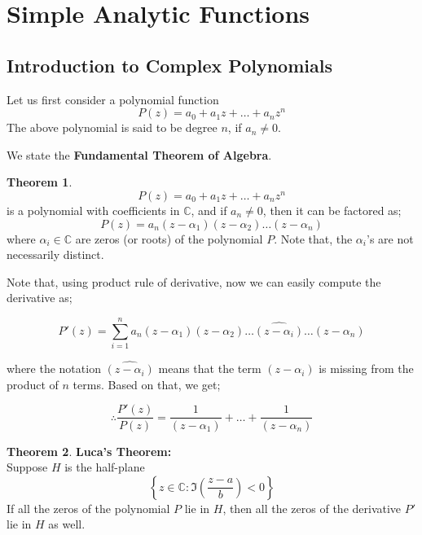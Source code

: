 \documentclass[12pt]{article}
\newcommand{\C}{\mathbb{C}}
\let\oldsection\section
\renewcommand\section{\clearpage\oldsection}
\theoremstyle{definition}
\newtheorem{thm}{Theorem}
\newenvironment{theorem}{
\begin{tcolorbox}[colback=green!5!white,colframe=green!75!black, parbox = false]\begin{thm} }{\end{thm}\end{tcolorbox} }
\begin{document}
\section{Simple Analytic Functions}

\subsection{Introduction to Complex Polynomials}
Let us first consider a polynomial function 
$$P(z) = a_0 + a_1 z + \dots + a_n z^n$$
The above polynomial is said to be degree $n$, if $a_n \neq 0$.

We state the \textbf{Fundamental Theorem of Algebra}.

\begin{theorem}
    $$P(z) = a_0 + a_1 z + \dots + a_n z^n$$
    is a polynomial with coefficients in $\C$, and if $a_n \neq 0$, then it can be factored as;
    $$P(z) = a_n (z - \alpha_1)(z - \alpha_2)\dots (z - \alpha_n)$$
    where $\alpha_i \in \C$ are zeros (or roots) of the polynomial $P$. Note that, the $\alpha_i$'s are not necessarily distinct.
\end{theorem}

Note that, using product rule of derivative, now we can easily compute the derivative as;

$$P'(z) = \sum_{i = 1}^{n} a_n (z-\alpha_1)(z-\alpha_2)\dots \widehat{(z-\alpha_i)} \dots (z-\alpha_n)$$

where the notation $\widehat{(z-\alpha_i)}$ means that the term $(z-\alpha_i)$ is missing from the product of $n$ terms. Based on that, we get;

$$\therefore \dfrac{P'(z)}{P(z)} = \dfrac{1}{(z-\alpha_1)} + \dots + \dfrac{1}{(z-\alpha_n)}$$


\begin{theorem}
    \textbf{Luca's Theorem:}\\
    Suppose $H$ is the half-plane 
    $$\left\{ z \in \C : \Im\left( \dfrac{z - a}{b} \right) < 0 \right\}$$
    If all the zeros of the polynomial $P$ lie in $H$, then all the zeros of the derivative $P'$ lie in $H$ as well.
\end{theorem}
\end{document}
